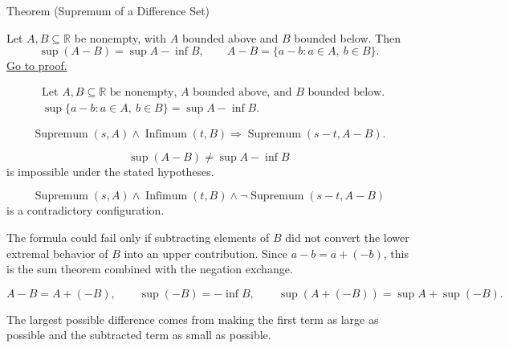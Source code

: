 \begin{theorembox}{Theorem (Supremum of a Difference Set)}
\begin{theorem}
\label{thm:supremum-difference-set}
Let $A,B\subseteq\mathbb{R}$ be nonempty, with $A$ bounded above and $B$ bounded below. Then
\[
  \sup(A-B)=\sup A-\inf B,
  \qquad
  A-B=\{a-b:a\in A,\ b\in B\}.
\]
\hyperref[prf:supremum-difference-set]{Go to proof.}
\end{theorem}
\end{theorembox}

\begin{remark*}
\[
\begin{aligned}
&\text{Let }A,B\subseteq\mathbb{R}\text{ be nonempty, }A\text{ bounded above, and }B\text{ bounded below.}\\
&\sup\{a-b:a\in A,\ b\in B\}=\sup A-\inf B.
\end{aligned}
\]
\end{remark*}

\begin{remark*}
\[
\operatorname{Supremum}(s,A)\land \operatorname{Infimum}(t,B)
\Longrightarrow
\operatorname{Supremum}(s-t,A-B).
\]
\end{remark*}

\begin{remark*}
\[
\sup(A-B)\ne \sup A-\inf B
\]
is impossible under the stated hypotheses.
\end{remark*}

\begin{remark*}
\[
\operatorname{Supremum}(s,A)\land \operatorname{Infimum}(t,B)
\land
\neg\operatorname{Supremum}(s-t,A-B)
\]
is a contradictory configuration.
\end{remark*}

\begin{remark*}
The formula could fail only if subtracting elements of $B$ did not convert the lower extremal behavior of $B$ into an upper contribution. Since $a-b=a+(-b)$, this is the sum theorem combined with the negation exchange.
\end{remark*}

\begin{remark*}
\[
A-B=A+(-B),
\qquad
\sup(-B)=-\inf B,
\qquad
\sup(A+(-B))=\sup A+\sup(-B).
\]
\end{remark*}

\begin{remark*}[Interpretation]
The largest possible difference comes from making the first term as large as possible and the subtracted term as small as possible.
\end{remark*}

